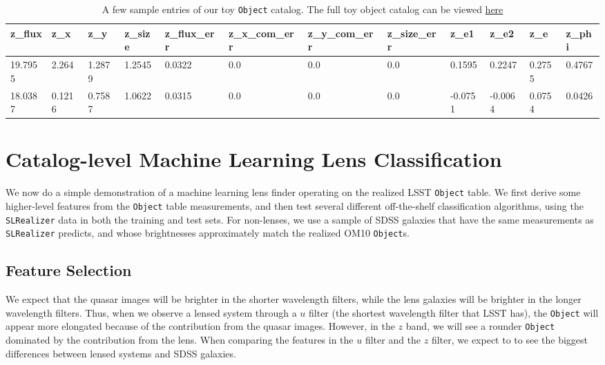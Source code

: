 \documentclass[\docopts]{\docclass}
\def\SLRealizer{\texttt{SLRealizer}\xspace}
\def\Object{\texttt{Object}\xspace}
\begin{document}
\begin{table}[!h]
\begin{tabular}{|l|l|l|l|l|l|l|l|l|l|l|l|}
\hline
z\_flux & z\_x   & z\_y   & z\_size & z\_flux\_err & z\_x\_com\_err & z\_y\_com\_err & z\_size\_err & z\_e1   & z\_e2   & z\_e   & z\_phi \\ \hline
19.7955 & 2.264  & 1.2879 & 1.2545  & 0.0322       & 0.0            & 0.0            & 0.0          & 0.1595  & 0.2247  & 0.2755 & 0.4767 \\
18.0387 & 0.1216 & 0.7587 & 1.0622  & 0.0315       & 0.0            & 0.0            & 0.0          & -0.0751 & -0.0064 & 0.0754 & 0.0426 \\ \hline
\end{tabular}

\caption{A few sample entries of our toy \Object catalog. The full toy
object catalog can be viewed
\href{https://www.dropbox.com/s/ob51rxjexzuervl/toy_object_catalog.csv?dl=0}{here}}
\label{tab:object}
\end{table}



\section{Catalog-level Machine Learning Lens Classification}
\label{sec:ml}

We now do a simple demonstration of a machine learning lens finder
operating on the realized LSST \Object table. We first derive some higher-level
features from the \Object table measurements, and then test several
different off-the-shelf classification algorithms, using the \SLRealizer
data in both the training and test sets. For non-lenses, we use a sample
of SDSS galaxies that have the same measurements as \SLRealizer
predicts, and whose brightnesses approximately match the realized OM10
{\Object}s.

\subsection{Feature Selection}
\label{subsec:feature}

We expect that the quasar images will be brighter in the shorter
wavelength filters, while the lens galaxies will be brighter in the
longer wavelength filters. Thus, when we observe a lensed system through
a $u$ filter (the shortest wavelength filter that LSST has), the \Object
will appear more elongated because of the contribution from the quasar
images. However, in the $z$ band, we will see a rounder \Object
dominated by  the contribution from the lens. When comparing the
features in the $u$ filter and the $z$ filter, we expect to to see the
biggest differences between lensed systems and SDSS galaxies.
\end{document}
